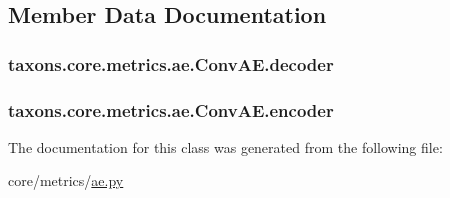 \subsection{Member Data Documentation}
\subsubsection[{\texorpdfstring{decoder}{decoder}}]{\setlength{\rightskip}{0pt plus 5cm}taxons.\+core.\+metrics.\+ae.\+Conv\+A\+E.\+decoder}\hypertarget{classtaxons_1_1core_1_1metrics_1_1ae_1_1_conv_a_e_a89ec0833ed8f6d1131d2d4d03be65786}{}\label{classtaxons_1_1core_1_1metrics_1_1ae_1_1_conv_a_e_a89ec0833ed8f6d1131d2d4d03be65786}
\subsubsection[{\texorpdfstring{encoder}{encoder}}]{\setlength{\rightskip}{0pt plus 5cm}taxons.\+core.\+metrics.\+ae.\+Conv\+A\+E.\+encoder}\hypertarget{classtaxons_1_1core_1_1metrics_1_1ae_1_1_conv_a_e_a0d77209045e8097fab50ec3cb16cf6d4}{}\label{classtaxons_1_1core_1_1metrics_1_1ae_1_1_conv_a_e_a0d77209045e8097fab50ec3cb16cf6d4}


The documentation for this class was generated from the following file\+:\begin{DoxyCompactItemize}
\item 
core/metrics/\hyperlink{ae_8py}{ae.\+py}\end{DoxyCompactItemize}
